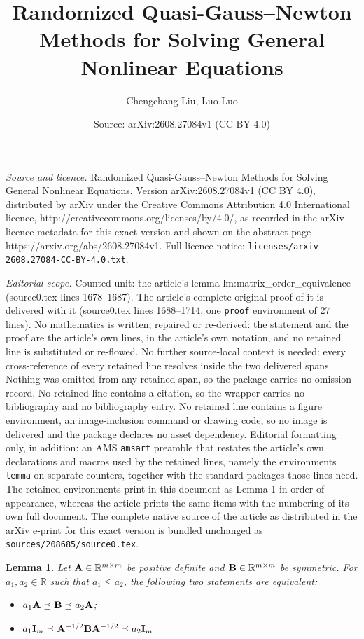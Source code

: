 \documentclass[10pt,a4paper]{amsart}
\title{Randomized Quasi-Gauss--Newton Methods for Solving General Nonlinear Equations}
\author{Chengchang Liu, Luo Luo}
\date{Source: arXiv:2608.27084v1 (CC BY 4.0)}
\newtheorem{lemma}{Lemma}
\def\A{{\bf A}}
\def\B{{\bf B}}
\def\BR{{\mathbb{R}}}
\def\I{{\bf I}}
\begin{document}
\maketitle

\noindent\emph{Source and licence.} Randomized Quasi-Gauss--Newton Methods for Solving General Nonlinear Equations. Version arXiv:2608.27084v1 (CC BY 4.0), distributed by arXiv under the Creative Commons Attribution 4.0 International licence, http://creativecommons.org/licenses/by/4.0/, as recorded in the arXiv licence metadata for this exact version and shown on the abstract page https://arxiv.org/abs/2608.27084v1. Full licence notice: \texttt{licenses/arxiv-2608.27084-CC-BY-4.0.txt}.\par\smallskip

\noindent\textit{Editorial scope.} Counted unit: the article's lemma lm:matrix\_order\_equivalence (source0.tex lines 1678--1687). The article's complete original proof of it is delivered with it (source0.tex lines 1688--1714, one \texttt{proof} environment of 27 lines). No mathematics is written, repaired or re-derived: the statement and the proof are the article's own lines, in the article's own notation, and no retained line is substituted or re-flowed.  No further source-local context is needed: every cross-reference of every retained line resolves inside the two delivered spans.  Nothing was omitted from any retained span, so the package carries no omission record.  No retained line contains a citation, so the wrapper carries no bibliography and no bibliography entry.  No retained line contains a figure environment, an image-inclusion command or drawing code, so no image is delivered and the package declares no asset dependency.  Editorial formatting only, in addition: an AMS \texttt{amsart} preamble that restates the article's own declarations and macros used by the retained lines, namely the environments \texttt{lemma} on separate counters, together with the standard packages those lines need.  The retained environments print in this document as Lemma 1 in order of appearance, whereas the article prints the same items with the numbering of its own full document.  The complete native source of the article as distributed in the arXiv e-print for this exact version is bundled unchanged as \texttt{sources/208685/source0.tex}.
\begin{lemma}
\label{lm:matrix_order_equivalence}
Let $\A\in\BR^{m\times m}$ be positive definite and
$\B\in\BR^{m\times m}$ be symmetric.
For $a_1,a_2\in\BR$ such that $a_1\leq a_2$, the following two statements are equivalent: 
\begin{itemize}
\item $a_1\A\preceq\B\preceq a_2\A$;
\item $a_1\I_m\preceq\A^{-1/2}\B\A^{-1/2}\preceq a_2\I_m$
\end{itemize}
\end{lemma}
\end{document}
